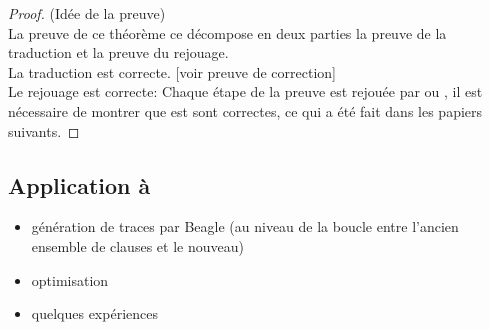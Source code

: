 \begin{proof}(Idée de la preuve)
\\La preuve de ce théorème ce décompose en deux parties la preuve de la traduction et la preuve du rejouage.
\\La traduction est correcte. [voir preuve de correction]
\\Le rejouage est correcte: Chaque étape de la preuve est rejouée par \metistac ou \coopertac, il est nécessaire de montrer que \metistac est \coopertac sont correctes, ce qui a été fait dans les papiers suivants.
\end{proof}



\subsection{Application à \beagle}
\begin{itemize}
\item génération de traces par Beagle (au niveau de la boucle entre
  l'ancien ensemble de clauses et le nouveau)

\item optimisation

\item quelques expériences

\end{itemize}

